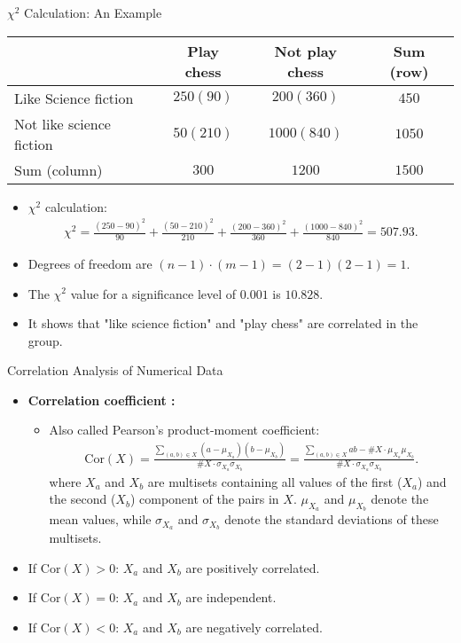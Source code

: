 \begin{frame}{$\chi^2$ Calculation: An Example}
	\centering
	\begin{tabular}{l|c|c|c|}
		                         & Play chess & Not play chess & Sum (row) \\\hline
		Like Science fiction     & $250 (90)$ & $200 (360)$    & $450$
		\\\hline
		Not like science fiction & $50 (210)$ & $1000 (840)$   & $1050$
		\\\hline
		Sum (column)             & $300$      & $1200$         & $1500$
		\\\hline
	\end{tabular}
	\begin{itemize}
		\item $\chi^2$ calculation:
		      \begin{align}
			      \chi^2 = \frac{(250-90)^2}{90} + \frac{(50-210)^2}{210} +
			      \frac{(200-360)^2}{360} + \frac{(1000-840)^2}{840} = 507.93.
		      \end{align}
		\item Degrees of freedom are $(n-1)\cdot(m-1) = (2-1)(2-1) = 1$.
		\item The $\chi^2$ value for a significance level of $0.001$ is
		      $10.828$.
		\item It shows that "like science fiction" and "play chess" are
		      correlated in the group.
	\end{itemize}
\end{frame}

\begin{frame}{Correlation Analysis of Numerical Data}
	\begin{itemize}
		\item \textbf{\color{airforceblue}Correlation coefficient :}
		      \begin{itemize}
			      \item Also called Pearson's product-moment coefficient:
			            \begin{align}
				            \text{Cor}(X) = \frac{\sum_{(a, b) \in X}
					            (a-\mu_{X_a})(b-\mu_{X_b})}{\#X\cdot\sigma_{X_a}\sigma_{X_b}} =
				            \frac{\sum_{(a, b) \in X}ab -\#X\cdot\mu_{X_a}\mu_{X_b}}{\#X\cdot
					            \sigma_{X_a}\sigma_{X_b}}.
			            \end{align}
			            where $X_a$ and $X_b$ are multisets containing all values of the
			            first
			            ($X_a$) and the second ($X_b$) component of the pairs in $X$.
			            $\mu_{X_a}$ and $\mu_{X_b}$ denote the mean values, while
			            $\sigma_{X_a}$ and $\sigma_{X_b}$ denote the standard
			            deviations of these multisets.
		      \end{itemize}
		\item If $\text{Cor}(X) > 0$: $X_a$ and $X_b$ are positively
		      correlated.
		\item If $\text{Cor}(X) = 0$: $X_a$ and $X_b$ are independent.
		\item If $\text{Cor}(X) < 0$: $X_a$ and $X_b$ are negatively
		      correlated.
	\end{itemize}
\end{frame}

